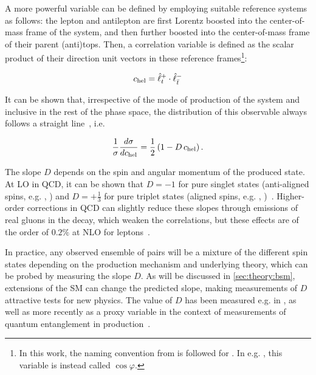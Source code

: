 A more powerful variable can be defined by employing suitable reference systems as follows: the lepton and antilepton are first Lorentz boosted into the center-of-mass frame of the \ttbar system, and then further boosted into the center-of-mass frame of their parent (anti)tops. Then, a correlation variable \chel is defined as the scalar product of their direction unit vectors in these reference frames\footnote{
In this work, the naming convention from  is followed for \chel. In e.g. , this variable is instead called $\cos \varphi$.
}:

\begin{equation}
\label{eq:theory:cheldef}
    c_{\mathrm{hel}} = \hat{\ell}^+_{t} \cdot \hat{\ell}^-_{\bar{t}} 
\end{equation}

It can be shown that, irrespective of the mode of production of the \ttbar system and inclusive in the rest of the phase space, the distribution of this observable always follows a straight line~\cite{Bernreuther:2004jv}, i.e.

\begin{equation}
\label{eq:theory:chel}
    \frac{1}{\sigma} \frac{d \sigma}{d c_{\mathrm{hel}}} = \frac{1}{2} \left( 1 - D \, c_{\mathrm{hel}} \right) .
\end{equation}

The slope $D$ depends on the spin and angular momentum of the produced \ttbar state. At LO in QCD, it can be shown that $D=-1$ for pure singlet states (anti-aligned spins, e.g. , ) and $D=+\frac{1}{3}$ for pure triplet states (aligned spins, e.g. , )~\cite{Maltoni:2024tul,Cheng:2024btk}. Higher-order corrections in QCD can slightly reduce these slopes through emissions of real gluons in the decay, which weaken the correlations, but these effects are of the order of $0.2\%$ at NLO for leptons~\cite{Czarnecki:1990pe,Bernreuther:2003ga}. %

In practice, any observed ensemble of \ttbar pairs will be a mixture of the different spin states depending on the production mechanism and underlying theory, which can be probed by measuring the slope $D$. As will be discussed in \cref{sec:theory:bsm}, extensions of the SM can change the predicted slope, making measurements of $D$ attractive tests for new physics. The value of $D$ has been measured e.g. in , as well as more recently as a proxy variable in the context of measurements of quantum entanglement in \ttbar production~\cite{CMS:TOP-23-001,ATLAS:2023fsd}.

